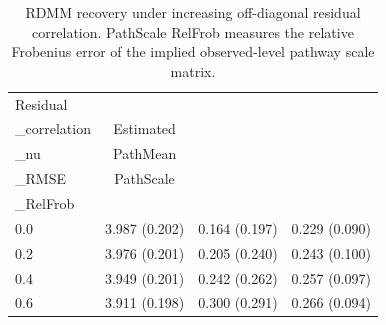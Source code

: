 \begin{table}[!ht]
\centering
\caption{RDMM recovery under increasing off-diagonal residual correlation. PathScale RelFrob measures the relative Frobenius error of the implied observed-level pathway scale matrix.}
\label{tab:covariance-sensitivity-recovery}
\begin{tabular}{lccc}
\hline
Residual\\_correlation & Estimated\\_nu & PathMean\\_RMSE & PathScale\\_RelFrob \\
\hline
0.0 & 3.987 (0.202) & 0.164 (0.197) & 0.229 (0.090) \\
0.2 & 3.976 (0.201) & 0.205 (0.240) & 0.243 (0.100) \\
0.4 & 3.949 (0.201) & 0.242 (0.262) & 0.257 (0.097) \\
0.6 & 3.911 (0.198) & 0.300 (0.291) & 0.266 (0.094) \\
\hline
\end{tabular}
\end{table}

